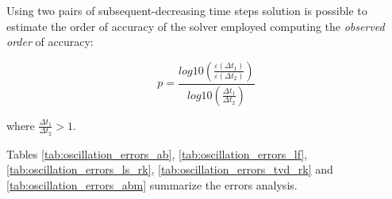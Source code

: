\documentclass[pdftex,preprint,3p,times,numbers]{elsarticle}
\begin{document}
Using two pairs of subsequent-decreasing time steps solution is possible to estimate the order of accuracy of the solver employed computing the \emph{observed order} of accuracy:

\begin{equation}
  p = \frac{log10 \left( \frac{\varepsilon (\Delta t_1)}{\varepsilon (\Delta t_2)} \right)}{log10 \left( \frac{\Delta t_1}{\Delta t_2} \right)}
\label{eq:oscillation-observed-order}
\end{equation}

where $\frac{\Delta t_1}{\Delta t_2}>1$.

Tables \ref{tab:oscillation_errors_ab}, \ref{tab:oscillation_errors_lf}, \ref{tab:oscillation_errors_ls_rk}, \ref{tab:oscillation_errors_tvd_rk} and \ref{tab:oscillation_errors_abm} summarize the errors analysis.
\end{document}
